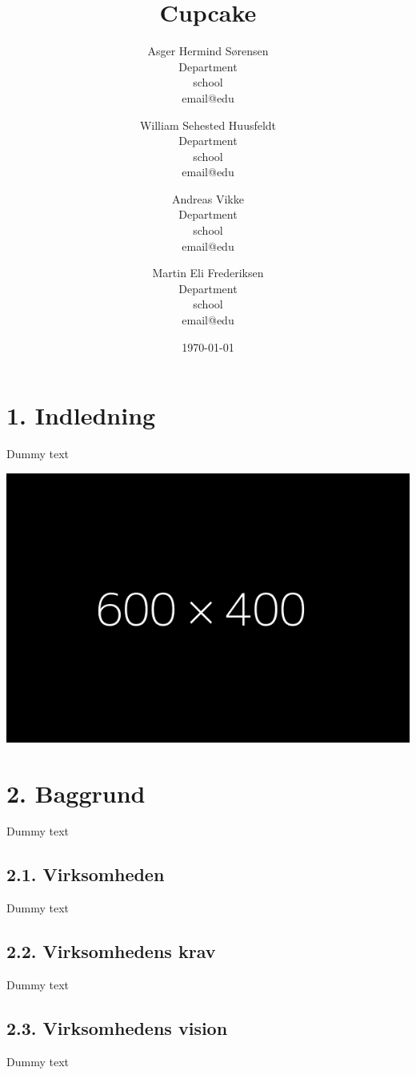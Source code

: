 \documentclass[11pt]{report}
\title{Cupcake}
\author{
    Asger Hermind Sørensen\\
    Department\\
    school\\
    email@edu
  \and
    William Sehested Huusfeldt\\
    Department\\
    school\\
    email@edu
  \and
    Andreas Vikke\\
    Department\\
    school\\
    email@edu
  \and
    Martin Eli Frederiksen\\
    Department\\
    school\\
    email@edu
}
\date{\today}
\begin{document}
\maketitle

\renewcommand{\cftchapleader}{\cftdotfill{\cftdotsep}}
\tableofcontents
\newpage

\chapter*{1. Indledning}
Dummy text
\begin{center}
\includegraphics[width=15cm]{fff.png}
\end{center}

\newpage

\chapter*{2. Baggrund}
Dummy text
\section*{2.1. Virksomheden}
Dummy text
\section*{2.2. Virksomhedens krav}
Dummy text
\section*{2.3. Virksomhedens vision}
Dummy text
\end{document}
